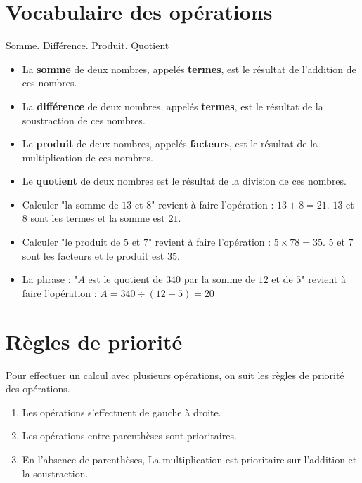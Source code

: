 \begin{pageCours} 

\section{Vocabulaire des opérations}

\begin{DefT}{Somme. Différence. Produit. Quotient}
\begin{itemize}[leftmargin=*]
\item La \textbf{somme} de deux nombres, appelés \textbf{termes}, est le résultat de l'addition de ces nombres.
\item La \textbf{différence} de deux nombres, appelés \textbf{termes}, est le résultat de la soustraction de ces nombres.
\item Le \textbf{produit} de deux nombres, appelés \textbf{facteurs}, est le résultat de la multiplication de ces nombres.
\item Le \textbf{quotient} de deux nombres est le résultat de la division de ces nombres.
\end{itemize}
\end{DefT}

\begin{Ex}

\begin{itemize}[leftmargin=*]
\item Calculer "la somme de $13$ et $8$" revient à faire l'opération : $13+8=21$. $13$ et $8$ sont les termes et la somme est $21$.
\item Calculer "le produit de $5$ et $7$" revient à faire l'opération : $5 \times 78=35$. $5$ et $7$ sont les facteurs et le produit est $35$.
\item La phrase : "$A$ est le quotient de $340$ par la somme de $12$ et de $5$" revient à faire l'opération : $A=340\div(12+5)=20$
\end{itemize}
\end{Ex}

\section{Règles de priorité}

\begin{Reg}
Pour effectuer un calcul avec plusieurs opérations, on suit les règles de priorité des opérations.
\begin{enumerate}[leftmargin=*]
\item Les opérations s'effectuent de gauche à droite.
\item Les opérations entre parenthèses sont prioritaires.
\item En l'absence de parenthèses, La multiplication est prioritaire sur l'addition et la soustraction.
\end{enumerate}
\end{Reg}


\end{pageCours}
